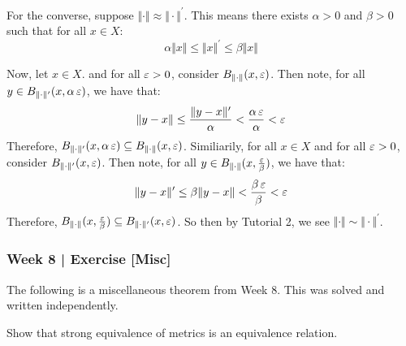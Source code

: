 \newpage
\begin{pf}[source=Alan]
    For the converse, suppose $\Vert \cdot \Vert \approx \Vert \cdot
    \Vert^\prime$. This means there exists $\alpha > 0$ and $\beta > 0$ such that
    for all $x \in X$:
    $$
    \alpha \Vert x \Vert \leq \Vert x \Vert^\prime \leq \beta \Vert x \Vert
    $$

    Now, let $x \in X$. and for all $\operatorname{\varepsilon} > 0$, consider $B_{\Vert \cdot \Vert}
    (x, \operatorname{\varepsilon})$. Then note, for all $y \in B_{\Vert \cdot \Vert^\prime}(x, \alpha
    \operatorname{\varepsilon})$, we have that:
    $$
    \Vert y - x \Vert \leq \frac{ \Vert y - x \Vert^\prime }{\alpha}
    < \frac{\alpha \operatorname{\varepsilon}}{\alpha} < \operatorname{\varepsilon}
    $$
    Therefore, $B_{\Vert \cdot \Vert^\prime}(x, \alpha \operatorname{\varepsilon}) \subseteq 
    B_{\Vert \cdot \Vert}(x, \operatorname{\varepsilon})$. \vsp
    Similiarily, for all $x \in X$ and for all $\operatorname{\varepsilon} > 0$,
    consider $B_{\Vert \cdot \Vert^\prime}(x, \operatorname{\varepsilon})$. 
    Then note, for all $y \in B_{\Vert \cdot \Vert}(x, \frac{\operatorname{\varepsilon}}{\beta})$, we
    have that:
    $$
    \Vert y - x \Vert^\prime \leq  \beta \Vert y - x \Vert < \frac{\beta\operatorname{\varepsilon}}
    {\beta} < \operatorname{\varepsilon}
    $$
    Therefore, $B_{\Vert \cdot \Vert}(x, \frac{\operatorname{\varepsilon}}{\beta}) \subseteq B_{\Vert
    \cdot \Vert^\prime}(x, \operatorname{\varepsilon})$. So then by Tutorial 2, we see $\Vert \cdot
    \Vert \sim \Vert \cdot \Vert^\prime$.
\end{pf}

\newpage
\subsubsection{Week 8 | Exercise [Misc]}

The following is a miscellaneous theorem from Week 8.
This was solved and written independently.

\begin{exr}[num=6.257]
    Show that strong equivalence of metrics is an equivalence relation.
\end{exr}

